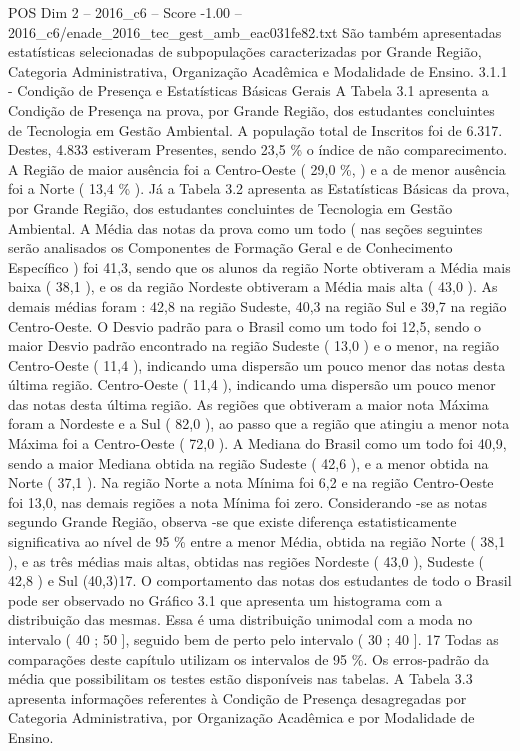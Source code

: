 \begin{textsample}{POS Dim 2 – 2016\_c6 – Score -1.00 – 2016\_c6/enade\_2016\_tec\_gest\_amb\_eac031fe82.txt}
São também apresentadas estatísticas selecionadas de subpopulações caracterizadas por Grande Região, Categoria Administrativa, Organização Acadêmica e Modalidade de Ensino. 3.1.1 - Condição de Presença e Estatísticas Básicas Gerais A Tabela 3.1 apresenta a Condição de Presença na prova, por Grande Região, dos estudantes concluintes de Tecnologia em Gestão Ambiental.
A população total de Inscritos foi de 6.317.
Destes, 4.833 estiveram Presentes, sendo 23,5 \% o índice de não comparecimento.
A Região de maior ausência foi a Centro-Oeste ( 29,0 \%, ) e a de menor ausência foi a Norte ( 13,4 \% ).
Já a Tabela 3.2 apresenta as Estatísticas Básicas da prova, por Grande Região, dos estudantes concluintes de Tecnologia em Gestão Ambiental.
A Média das notas da prova como um todo ( nas seções seguintes serão analisados os Componentes de Formação Geral e de Conhecimento Específico ) foi 41,3, sendo que os alunos da região Norte obtiveram a Média mais baixa ( 38,1 ), e os da região Nordeste obtiveram a Média mais alta ( 43,0 ).
As demais médias foram : 42,8 na região Sudeste, 40,3 na região Sul e 39,7 na região Centro-Oeste.
O Desvio padrão para o Brasil como um todo foi 12,5, sendo o maior Desvio padrão encontrado na região Sudeste ( 13,0 ) e o menor, na região Centro-Oeste ( 11,4 ), indicando uma dispersão um pouco menor das notas desta última região.
Centro-Oeste ( 11,4 ), indicando uma dispersão um pouco menor das notas desta última região.
As regiões que obtiveram a maior nota Máxima foram a Nordeste e a Sul ( 82,0 ), ao passo que a região que atingiu a menor nota Máxima foi a Centro-Oeste ( 72,0 ).
A Mediana do Brasil como um todo foi 40,9, sendo a maior Mediana obtida na região Sudeste ( 42,6 ), e a menor obtida na Norte ( 37,1 ).
Na região Norte a nota Mínima foi 6,2 e na região Centro-Oeste foi 13,0, nas demais regiões a nota Mínima foi zero.
Considerando -se as notas segundo Grande Região, observa -se que existe diferença estatisticamente significativa ao nível de 95 \% entre a menor Média, obtida na região Norte ( 38,1 ), e as três médias mais altas, obtidas nas regiões Nordeste ( 43,0 ), Sudeste ( 42,8 ) e Sul (40,3)17.
O comportamento das notas dos estudantes de todo o Brasil pode ser observado no Gráfico 3.1 que apresenta um histograma com a distribuição das mesmas.
Essa é uma distribuição unimodal com a moda no intervalo ( 40 ; 50 ], seguido bem de perto pelo intervalo ( 30 ; 40 ]. 17 Todas as comparações deste capítulo utilizam os intervalos de 95 \%.
Os erros-padrão da média que possibilitam os testes estão disponíveis nas tabelas.
A Tabela 3.3 apresenta informações referentes à Condição de Presença desagregadas por Categoria Administrativa, por Organização Acadêmica e por Modalidade de Ensino.

\end{textsample}
